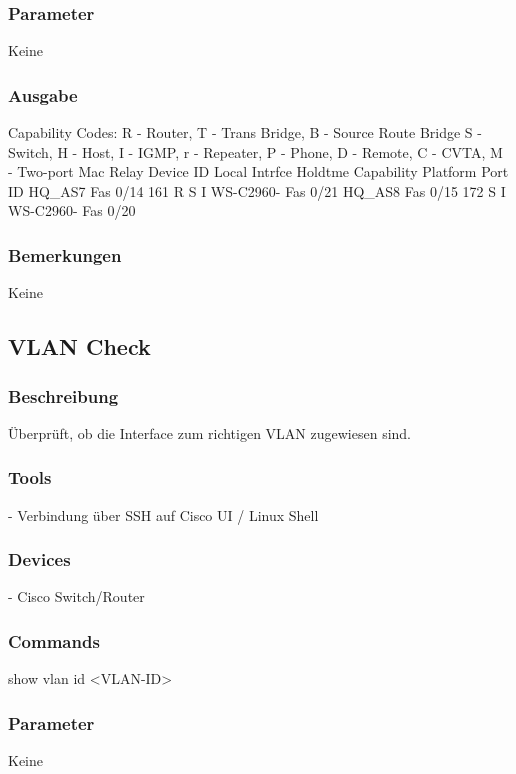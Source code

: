 \documentclass[a4,12pt]{scrartcl}
\begin{document}
\subsubsection{Parameter}
Keine
\subsubsection{Ausgabe}
Capability Codes: R - Router, T - Trans Bridge, B - Source Route Bridge\newline
                  S - Switch, H - Host, I - IGMP, r - Repeater, P - Phone,\newline
                  D - Remote, C - CVTA, M - Two-port Mac Relay\newline
Device ID        Local Intrfce     Holdtme    Capability  Platform  Port ID\newline
HQ_AS7           Fas 0/14          161             R S I  WS-C2960- Fas 0/21\newline
HQ_AS8           Fas 0/15          172              S I   WS-C2960- Fas 0/20\newline
\subsubsection{Bemerkungen}
Keine





\subsection{VLAN Check}
\subsubsection{Beschreibung}
Überprüft, ob die Interface zum richtigen VLAN zugewiesen sind.
\subsubsection{Tools}
- Verbindung über SSH auf Cisco UI / Linux Shell
\subsubsection{Devices}
- Cisco Switch/Router
\subsubsection{Commands}
show vlan id <VLAN-ID>
\subsubsection{Parameter}
Keine
\end{document}
